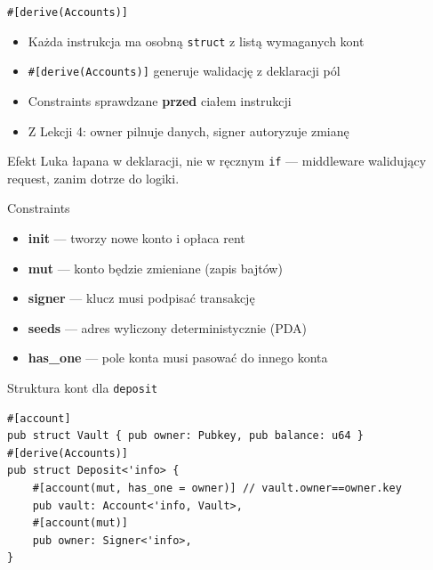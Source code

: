 \begin{frame}[fragile]{\texttt{\#[derive(Accounts)]}}
  \begin{itemize}
    \item Każda instrukcja ma osobną \texttt{struct} z listą wymaganych kont
    \item \texttt{\#[derive(Accounts)]} generuje walidację z deklaracji pól
    \item Constraints sprawdzane \textbf{przed} ciałem instrukcji
    \item Z Lekcji 4: owner pilnuje danych, signer autoryzuje zmianę
  \end{itemize}
  \begin{exampleblock}{Efekt}
    Luka łapana w deklaracji, nie w ręcznym \texttt{if} --- middleware walidujący
    request, zanim dotrze do logiki.
  \end{exampleblock}
\end{frame}

\begin{frame}[fragile]{Constraints}
  \begin{itemize}
    \item \textbf{init} --- tworzy nowe konto i opłaca rent
    \item \textbf{mut} --- konto będzie zmieniane (zapis bajtów)
    \item \textbf{signer} --- klucz musi podpisać transakcję
    \item \textbf{seeds} --- adres wyliczony deterministycznie (PDA)
    \item \textbf{has\_one} --- pole konta musi pasować do innego konta
  \end{itemize}
  \begin{block}{Struktura kont dla \texttt{deposit}}
\begin{lstlisting}
#[account]
pub struct Vault { pub owner: Pubkey, pub balance: u64 }
#[derive(Accounts)]
pub struct Deposit<'info> {
    #[account(mut, has_one = owner)] // vault.owner==owner.key
    pub vault: Account<'info, Vault>,
    #[account(mut)]
    pub owner: Signer<'info>,
}
\end{lstlisting}
  \end{block}
\end{frame}

